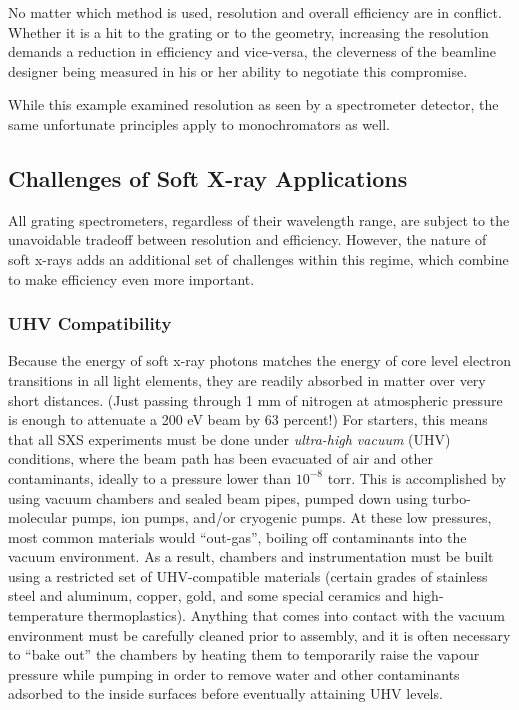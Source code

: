No matter which method is used, resolution and overall efficiency are in conflict.  Whether it is a hit to the grating or to the geometry, increasing the resolution demands a reduction in efficiency and vice-versa, the cleverness of the beamline designer being measured in his or her ability to negotiate this compromise.

While this example examined resolution as seen by a spectrometer detector, the same unfortunate principles apply to monochromators as well.

\subsection{Challenges of Soft X-ray Applications}
\label{challengesSXS}
All grating spectrometers, regardless of their wavelength range, are subject to the unavoidable tradeoff between resolution and efficiency.  However, the nature of soft x-rays adds an additional set of challenges within this regime, which combine to make efficiency even more important.

\subsubsection{UHV Compatibility}
Because the energy of soft x-ray photons matches the energy of core level electron transitions in all light elements, they are readily absorbed in matter over very short distances.  (Just passing through 1 mm of nitrogen at atmospheric pressure is enough to attenuate a 200 eV beam by 63 percent!)  For starters, this means that all SXS experiments must be done under \emph{ultra-high vacuum} (UHV) conditions, where the beam path has been evacuated of air and other contaminants, ideally to a pressure lower than $10^{-8}$ torr.  This is accomplished by using vacuum chambers and sealed beam pipes, pumped down using turbo-molecular pumps, ion pumps, and/or cryogenic pumps.  At these low pressures, most common materials would ``out-gas'', boiling off contaminants into the vacuum environment.  As a result, chambers and instrumentation must be built using a restricted set of UHV-compatible materials (certain grades of stainless steel and aluminum, copper, gold, and some special ceramics and high-temperature thermoplastics).  Anything that comes into contact with the vacuum environment must be carefully cleaned prior to assembly, and it is often necessary to ``bake out'' the chambers by heating them to temporarily raise the vapour pressure while pumping in order to remove water and other contaminants adsorbed to the inside surfaces before eventually attaining UHV levels.

